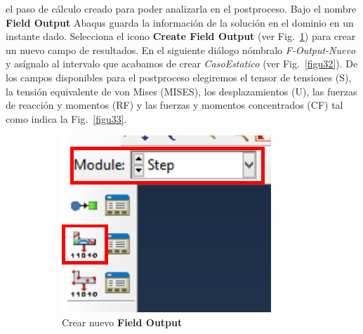 \begin{enumerate}
  el paso de cálculo creado para poder analizarla en el
  postproceso. Bajo el nombre \textbf{Field Output} Abaqus guarda la
  información de la solución en el dominio en un instante
  dado. Selecciona el icono \textbf{Create Field Output} (ver
  Fig.~\ref{figu31}) para crear un nuevo campo de resultados. En el
  siguiente diálogo nómbralo \textit{F-Output-Nuevo} y asígnalo al
  intervalo que acabamos de crear \textit{CasoEstatico} (ver
  Fig.~\ref{figu32}). De los campos disponibles para el postproceso
  elegiremos el tensor de tensiones (S), la tensión equivalente de von
  Mises (MISES), los desplazamientos (U), las fuerzas de reacción y
  momentos (RF) y las fuerzas y momentos concentrados (CF) tal como
  indica la Fig.~\ref{figu33}.
  \begin{figure}[H]
    \centering
    \begin{subfigure}{0.25\textwidth}
      \includegraphics[width=\textwidth]{./body/images/imagen31.pdf}
      \caption{Crear nuevo \textbf{Field Output}}
      \label{figu31}
    \end{subfigure}%
    ~ %
    \begin{subfigure}{0.33\textwidth}

\end{subfigure}
\end{figure}
\end{enumerate}
